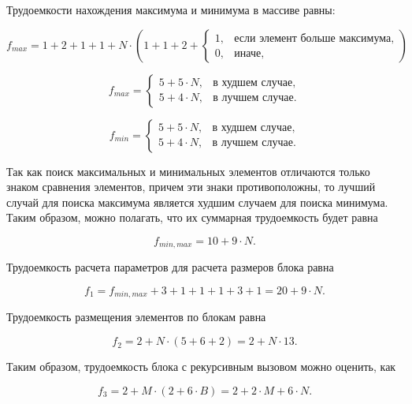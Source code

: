 Трудоемкости нахождения максимума и минимума в массиве равны:

\begin{equation}
	f_{max} = 1 + 2 + 1 + 1 + N \cdot \left(1 + 1 + 2 + \begin{cases}
		1, & \text{если элемент больше максимума}, \\
		0, & \text{иначе},
	\end{cases}\right)
\end{equation}

\begin{equation}
	f_{max} = \begin{cases}
		5 + 5 \cdot N, & \text{в худшем случае}, \\
		5 + 4 \cdot N, & \text{в лучшем случае}.
	\end{cases} 
\end{equation}

\begin{equation}
	f_{min} = \begin{cases}
		5 + 5 \cdot N, & \text{в худшем случае}, \\
		5 + 4 \cdot N, & \text{в лучшем случае}.
	\end{cases} 
\end{equation}

Так как поиск максимальных и минимальных элементов отличаются только знаком сравнения элементов, причем эти знаки противоположны, то лучший случай для поиска максимума является худшим случаем для поиска минимума. 
Таким образом, можно полагать, что их суммарная трудоемкость будет равна

\begin{equation}
	f_{min, max} = 10 + 9 \cdot N.
\end{equation}


Трудоемкость расчета параметров для расчета размеров блока равна

\begin{equation}
	f_1 = f_{min, max} + 3 + 1 + 1 + 1 + 3 + 1 = 20 + 9 \cdot N.
\end{equation}

Трудоемкость размещения элементов по блокам равна

\begin{equation}
	f_2 = 2 + N \cdot (5 + 6 + 2) = 2 + N \cdot 13.
\end{equation}

Таким образом, трудоемкость блока с рекурсивным вызовом можно оценить, как

\begin{equation}
	f_3 = 2 + M \cdot \left(2 + 6 \cdot B\right) = 2 + 2 \cdot M + 6 \cdot N.
\end{equation}

